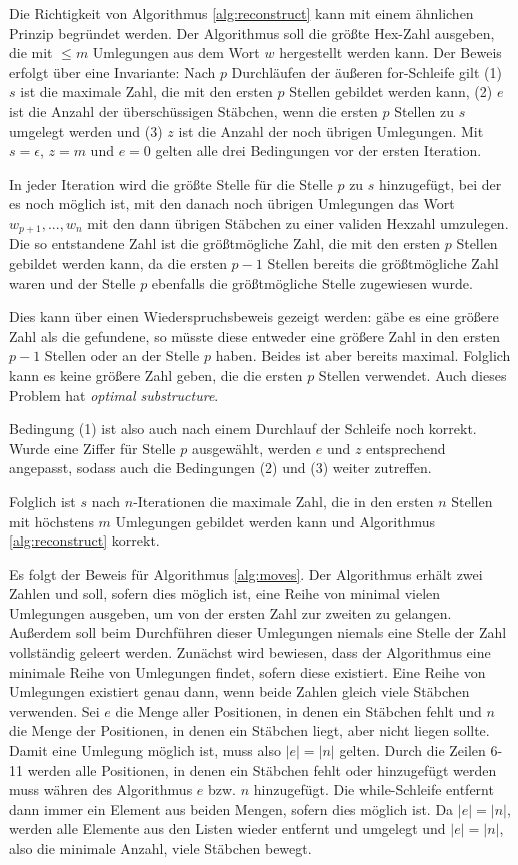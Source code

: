 \documentclass[a4paper,10pt,ngerman]{scrartcl}
\begin{document}
Die Richtigkeit von Algorithmus \ref*{alg:reconstruct} kann mit einem ähnlichen Prinzip begründet werden. 
Der Algorithmus soll die größte Hex-Zahl ausgeben, die mit $\leq m$ Umlegungen aus dem Wort $w$ hergestellt werden kann. 
Der Beweis erfolgt über eine Invariante: Nach $p$ Durchläufen der äußeren for-Schleife gilt (1) $s$ ist die maximale Zahl, die mit den ersten $p$ Stellen gebildet werden kann, (2) $e$ ist die Anzahl der überschüssigen Stäbchen, wenn die ersten $p$ Stellen zu $s$ umgelegt werden und (3) $z$ ist die Anzahl der noch übrigen Umlegungen.
Mit $s = \epsilon$, $z = m$ und $e = 0$ gelten alle drei Bedingungen vor der ersten Iteration.

In jeder Iteration wird die größte Stelle für die Stelle $p$ zu $s$ hinzugefügt, bei der es noch möglich ist, mit den danach noch übrigen Umlegungen das Wort $w_{p+1}, ..., w_n$ mit den dann übrigen Stäbchen zu einer validen Hexzahl umzulegen. 
Die so entstandene Zahl ist die größtmögliche Zahl, die mit den ersten $p$ Stellen gebildet werden kann, da die ersten $p-1$ Stellen bereits die größtmögliche Zahl waren und der Stelle $p$ ebenfalls die größtmögliche Stelle zugewiesen wurde. 

Dies kann über einen Wiederspruchsbeweis gezeigt werden: gäbe es eine größere Zahl als die gefundene, so müsste diese entweder eine größere Zahl in den ersten $p-1$ Stellen oder an der Stelle $p$ haben. Beides ist aber bereits maximal. Folglich kann es keine größere Zahl geben, die die ersten $p$ Stellen verwendet. Auch dieses Problem hat \textit{optimal substructure}.

Bedingung (1) ist also auch nach einem Durchlauf der Schleife noch korrekt. Wurde eine Ziffer für Stelle $p$ ausgewählt, werden $e$ und $z$ entsprechend angepasst, sodass auch die Bedingungen (2) und (3) weiter zutreffen. 

Folglich ist $s$ nach $n$-Iterationen die maximale Zahl, die in den ersten $n$ Stellen mit höchstens $m$ Umlegungen gebildet werden kann und Algorithmus \ref*{alg:reconstruct} korrekt.

Es folgt der Beweis für Algorithmus \ref*{alg:moves}.
Der Algorithmus erhält zwei Zahlen und soll, sofern dies möglich ist, eine Reihe von minimal vielen Umlegungen ausgeben, um von der ersten Zahl zur zweiten zu gelangen. Außerdem soll beim Durchführen dieser Umlegungen niemals eine Stelle der Zahl vollständig geleert werden. 
Zunächst wird bewiesen, dass der Algorithmus eine minimale Reihe von Umlegungen findet, sofern diese existiert. Eine Reihe von Umlegungen existiert genau dann, wenn beide Zahlen gleich viele Stäbchen verwenden. 
Sei $e$ die Menge aller Positionen, in denen ein Stäbchen fehlt und $n$ die Menge der Positionen, in denen ein Stäbchen liegt, aber nicht liegen sollte. 
Damit eine Umlegung möglich ist, muss also $|e| = |n|$ gelten. 
Durch die Zeilen 6-11 werden alle Positionen, in denen ein Stäbchen fehlt oder hinzugefügt werden muss währen des Algorithmus $e$ bzw. $n$ hinzugefügt.
Die while-Schleife entfernt dann immer ein Element aus beiden Mengen, sofern dies möglich ist. 
Da $|e| = |n|$, werden  alle Elemente aus den Listen wieder entfernt und umgelegt und $|e| = |n|$, also die minimale Anzahl, viele Stäbchen bewegt. 
\end{document}
